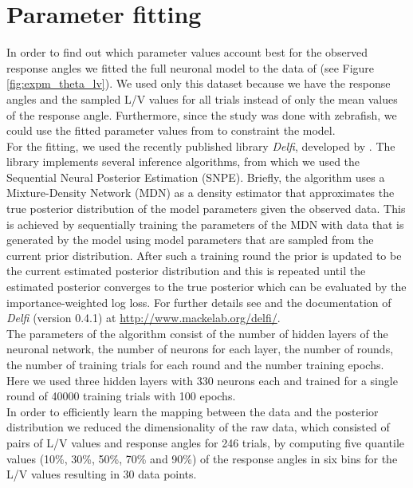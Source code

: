     \section{Parameter fitting}
    In order to find out which parameter values account best for the observed response angles we fitted the full neuronal model to the data of \cite{Bhattacharyya2017} (see Figure \ref{fig:expm_theta_lv}).
    We used only this dataset because we have the response angles and the sampled L/V values for all trials instead of only the mean values of the response angle.
    Furthermore, since the study was done with zebrafish, we could use the fitted parameter values from \cite{Koyama2016} to constraint the model.\\
    For the fitting, we used the recently published library \textit{Delfi}, developed by \cite{Lueckmann2018}.
    The library implements several inference algorithms, from which we used the Sequential Neural Posterior Estimation (SNPE).
    Briefly, the algorithm uses a Mixture-Density Network (MDN) as a density estimator that approximates the true posterior distribution of the model parameters given the observed data.
    This is achieved by sequentially training the parameters of the MDN with data that is generated by the model using model parameters that are sampled from the current prior distribution.
    After such a training round the prior is updated to be the current estimated posterior distribution and this is repeated until the estimated posterior converges to the true posterior which can be evaluated by the importance-weighted log loss.
    For further details see \cite{Lueckmann2018} and the documentation of \textit{Delfi} (version 0.4.1) at \href{http://www.mackelab.org/delfi/}{http://www.mackelab.org/delfi/}.\\
    The parameters of the algorithm consist of the number of hidden layers of the neuronal network, the number of neurons for each layer, the number of rounds, the number of training trials for each round and the number training epochs.
    Here we used three hidden layers with 330 neurons each and trained for a single round of 40000 training trials with 100 epochs.\\
    In order to efficiently learn the mapping between the data and the posterior distribution we reduced the dimensionality of the raw data, which consisted of pairs of L/V values and response angles for 246 trials, by computing five quantile values (10\%, 30\%, 50\%, 70\% and 90\%) of the response angles in six bins for the L/V values resulting in 30 data points.
